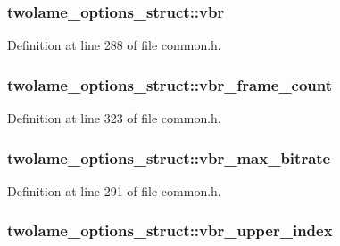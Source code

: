 \subsubsection[{\texorpdfstring{vbr}{vbr}}]{ twolame\+\_\+options\+\_\+struct\+::vbr}\hypertarget{structtwolame__options__struct_ac5e4a3519d895e56ff0daebaf255128b}{}\label{structtwolame__options__struct_ac5e4a3519d895e56ff0daebaf255128b}


Definition at line 288 of file common.\+h.

\subsubsection[{\texorpdfstring{vbr\+\_\+frame\+\_\+count}{vbr_frame_count}}]{ twolame\+\_\+options\+\_\+struct\+::vbr\+\_\+frame\+\_\+count}\hypertarget{structtwolame__options__struct_ab9e79c1f1ef2b4cedca215aaeb77a4b2}{}\label{structtwolame__options__struct_ab9e79c1f1ef2b4cedca215aaeb77a4b2}


Definition at line 323 of file common.\+h.

\subsubsection[{\texorpdfstring{vbr\+\_\+max\+\_\+bitrate}{vbr_max_bitrate}}]{ twolame\+\_\+options\+\_\+struct\+::vbr\+\_\+max\+\_\+bitrate}\hypertarget{structtwolame__options__struct_a21dd29160df5d99bfcc6909f424679e6}{}\label{structtwolame__options__struct_a21dd29160df5d99bfcc6909f424679e6}


Definition at line 291 of file common.\+h.

\subsubsection[{\texorpdfstring{vbr\+\_\+upper\+\_\+index}{vbr_upper_index}}]{ twolame\+\_\+options\+\_\+struct\+::vbr\+\_\+upper\+\_\+index}\hypertarget{structtwolame__options__struct_af500639a98da65332c4eb0feed0a101a}{}\label{structtwolame__options__struct_af500639a98da65332c4eb0feed0a101a}


